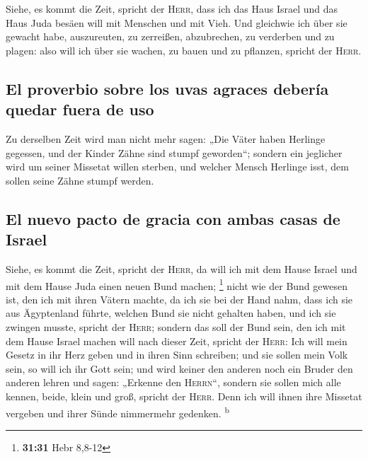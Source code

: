  Siehe, es kommt die Zeit, spricht der \textsc{Herr},
dass ich das Haus Israel und das Haus Juda besäen will mit Menschen und
mit Vieh.  Und gleichwie ich über sie gewacht habe,
auszureuten, zu zerreißen, abzubrechen, zu verderben und zu plagen: also
will ich über sie wachen, zu bauen und zu pflanzen, spricht der
\textsc{Herr}.

\hypertarget{el-proverbio-sobre-los-uvas-agraces-deberuxeda-quedar-fuera-de-uso}{%
\subsection{El proverbio sobre los uvas agraces debería quedar fuera de
uso}\label{el-proverbio-sobre-los-uvas-agraces-deberuxeda-quedar-fuera-de-uso}}

 Zu derselben Zeit wird man nicht mehr sagen: „Die Väter
haben Herlinge gegessen, und der Kinder Zähne sind stumpf geworden``;
 sondern ein jeglicher wird um seiner Missetat willen
sterben, und welcher Mensch Herlinge isst, dem sollen seine Zähne stumpf
werden.

\hypertarget{el-nuevo-pacto-de-gracia-con-ambas-casas-de-israel}{%
\subsection{El nuevo pacto de gracia con ambas casas de
Israel}\label{el-nuevo-pacto-de-gracia-con-ambas-casas-de-israel}}

 Siehe, es kommt die Zeit, spricht der \textsc{Herr}, da
will ich mit dem Hause Israel und mit dem Hause Juda einen neuen Bund
machen; \footnote{\textbf{31:31} Hebr 8,8-12}  nicht wie
der Bund gewesen ist, den ich mit ihren Vätern machte, da ich sie bei
der Hand nahm, dass ich sie aus Ägyptenland führte, welchen Bund sie
nicht gehalten haben, und ich sie zwingen musste, spricht der
\textsc{Herr};  sondern das soll der Bund sein, den ich
mit dem Hause Israel machen will nach dieser Zeit, spricht der
\textsc{Herr}: Ich will mein Gesetz in ihr Herz geben und in ihren Sinn
schreiben; und sie sollen mein Volk sein, so will ich ihr Gott sein;
 und wird keiner den anderen noch ein Bruder den anderen
lehren und sagen: „Erkenne den \textsc{Herrn}``, sondern sie sollen mich
alle kennen, beide, klein und groß, spricht der \textsc{Herr}. Denn ich
will ihnen ihre Missetat vergeben und ihrer Sünde nimmermehr gedenken.
\textsuperscript{b}

